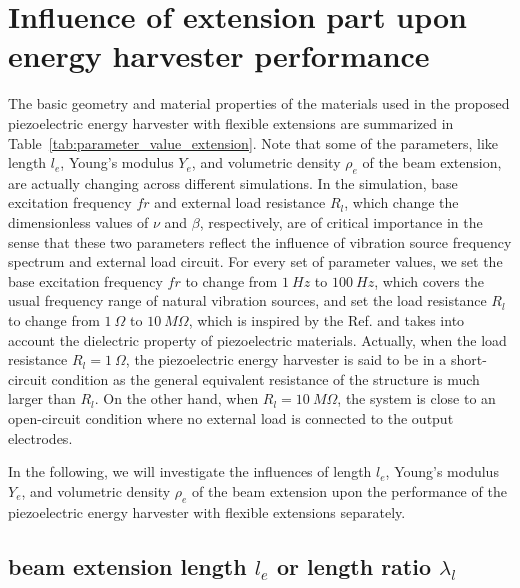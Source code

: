 \documentclass{elsarticle}
\begin{document}
\section{Influence of extension part upon energy harvester performance}


The basic geometry and material properties of the materials used in the proposed piezoelectric energy harvester with flexible extensions are summarized in Table~\ref{tab:parameter_value_extension}. Note that some of the parameters, like length $l_e$, Young's modulus $Y_e$, and volumetric density $\rho_e$ of the beam extension, are actually changing across different simulations. In the simulation, base excitation frequency $fr$ and external load resistance $R_l$, which change the dimensionless values of $\nu$ and $\beta$, respectively, are of critical importance in the sense that these two parameters reflect the influence of vibration source frequency spectrum and external load circuit. For every set of parameter values, we set the base excitation frequency $fr$ to change from $1\ Hz$ to $100\ Hz$, which covers the usual frequency range of natural vibration sources, and set the load resistance $R_l$ to change from $1\ \Omega$ to $10\ M\Omega$, which is inspired by the Ref. \cite{erturk2009experimentally} and takes into account the dielectric property of piezoelectric materials. Actually, when the load resistance $R_l = 1\ \Omega$, the piezoelectric energy harvester is said to be in a short-circuit condition as the general equivalent resistance of the structure is much larger than $R_l$. On the other hand, when $R_l = 10\ M\Omega$, the system is close to an open-circuit condition where no external load is connected to the output electrodes.

In the following, we will investigate the influences of length $l_e$, Young's modulus $Y_e$, and volumetric density $\rho_e$ of the beam extension upon the performance of the piezoelectric energy harvester with flexible extensions separately.

\subsection{beam extension length $l_e$ or length ratio $\lambda_l$}
\end{document}
